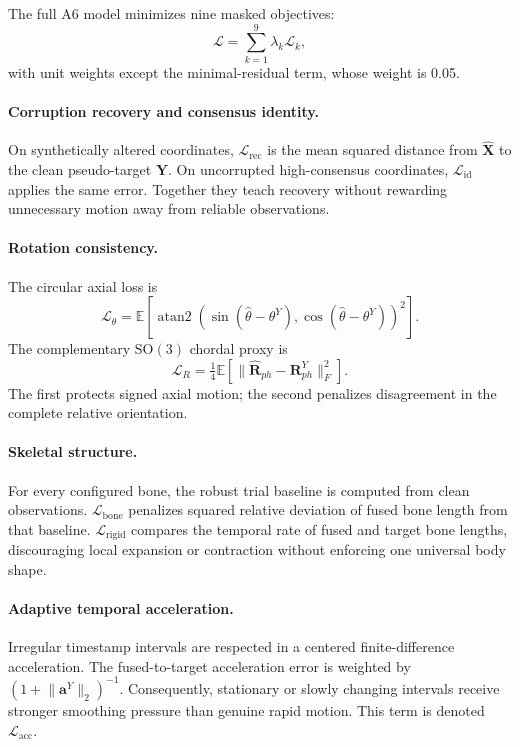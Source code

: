 The full A6 model minimizes nine masked objectives:
\begin{equation}
 \mathcal{L}=\sum_{k=1}^{9}\lambda_k\mathcal{L}_k,
 \label{eq:total-loss}
\end{equation}
with unit weights except the minimal-residual term, whose weight is 0.05.

\paragraph{Corruption recovery and consensus identity.}
On synthetically altered coordinates, $\mathcal{L}_{\mathrm{rec}}$ is the mean
squared distance from $\widehat{\mathbf{X}}$ to the clean pseudo-target
$\mathbf{Y}$. On uncorrupted high-consensus coordinates,
$\mathcal{L}_{\mathrm{id}}$ applies the same error. Together they teach recovery
without rewarding unnecessary motion away from reliable observations.

\paragraph{Rotation consistency.}
The circular axial loss is
\begin{equation}
 \mathcal{L}_{\theta}=\mathbb{E}
 [\operatorname{atan2}(\sin(\widehat{\theta}-\theta^{Y}),
 \cos(\widehat{\theta}-\theta^{Y}))^2].
\end{equation}
The complementary $\mathrm{SO}(3)$ chordal proxy is
\begin{equation}
 \mathcal{L}_{R}=\tfrac{1}{4}\mathbb{E}
 [\lVert\widehat{\mathbf{R}}_{ph}-\mathbf{R}^{Y}_{ph}\rVert_F^2].
\end{equation}
The first protects signed axial motion; the second penalizes disagreement in the
complete relative orientation.

\paragraph{Skeletal structure.}
For every configured bone, the robust trial baseline is computed from clean
observations. $\mathcal{L}_{\mathrm{bone}}$ penalizes squared relative deviation
of fused bone length from that baseline. $\mathcal{L}_{\mathrm{rigid}}$ compares
the temporal rate of fused and target bone lengths, discouraging local expansion
or contraction without enforcing one universal body shape.

\paragraph{Adaptive temporal acceleration.}
Irregular timestamp intervals are respected in a centered finite-difference
acceleration. The fused-to-target acceleration error is weighted by
$(1+\lVert\mathbf{a}^{Y}\rVert_2)^{-1}$. Consequently, stationary or slowly
changing intervals receive stronger smoothing pressure than genuine rapid
motion. This term is denoted $\mathcal{L}_{\mathrm{acc}}$.

